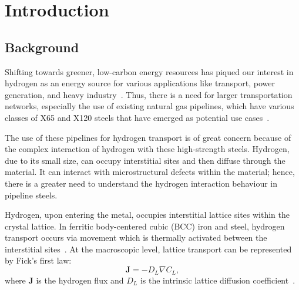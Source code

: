 \documentclass[a4paper,12pt,oneside]{report}
\begin{document}
\clearpage

\begin{singlespace}
\tableofcontents
\end{singlespace}

\clearpage
{}
{}
\begin{singlespace}
\listoffigures
\end{singlespace}

\clearpage
{}
{}
\begin{singlespace}
\listoftables
\end{singlespace}

\clearpage
{}

\chapter{Introduction}
\label{ch:introduction}

\section{Background}

Shifting towards greener, low-carbon energy resources has piqued our interest in hydrogen as an energy source for various applications like transport, power generation, and heavy industry~\cite{Lv2026,Chen2025}. Thus, there is a need for larger transportation networks, especially the use of existing natural gas pipelines, which have various classes of X65 and X120 steels that have emerged as potential use cases~\cite{Koren2023a,Koren2024a}.

The use of these pipelines for hydrogen transport is of great concern because of the complex interaction of hydrogen with these high-strength steels. Hydrogen, due to its small size, can occupy interstitial sites and then diffuse through the material. It can interact with microstructural defects within the material; hence, there is a greater need to understand the hydrogen interaction behaviour in pipeline steels.

Hydrogen, upon entering the metal, occupies interstitial lattice sites within the crystal lattice. In ferritic body-centered cubic (BCC) iron and steel, hydrogen transport occurs via movement which is thermally activated between the interstitial sites~\cite{Chen2025,Darken1949}. At the macroscopic level, lattice transport can be represented by Fick's first law:
\begin{equation}
\mathbf{J} = -D_L\nabla C_L,
\label{eq:fick_first_law}
\end{equation}
where $\mathbf{J}$ is the hydrogen flux and $D_L$ is the intrinsic lattice diffusion coefficient~\cite{Fallahmohammadi2013,Legrand2015}.
\end{document}
